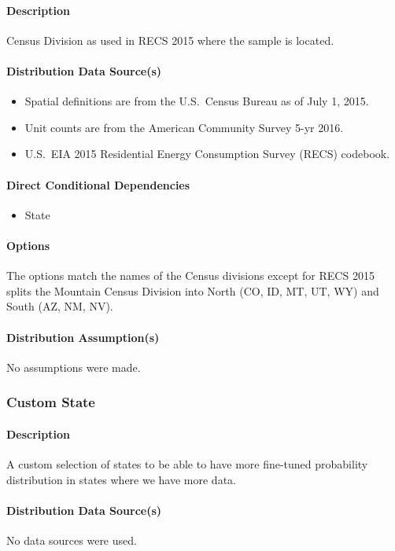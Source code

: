 \paragraph{Description}
Census Division as used in RECS 2015 where the sample is located.

\paragraph{Distribution Data Source(s)}
\begin{itemize}
    \item Spatial definitions are from the U.S.~Census Bureau as of July 1, 2015.
    \item Unit counts are from the American Community Survey 5-yr 2016.
    \item U.S.~EIA 2015 Residential Energy Consumption Survey (RECS) codebook.
\end{itemize}

\paragraph{Direct Conditional Dependencies}
\begin{itemize}
    \item State
\end{itemize}

\paragraph{Options}
The options match the names of the Census divisions except for RECS 2015 splits the Mountain Census Division into North (CO, ID, MT, UT, WY) and South (AZ, NM, NV).

\paragraph{Distribution Assumption(s)}
No assumptions were made.

\subsubsection{Custom State}
\paragraph{Description}
A custom selection of states to be able to have more fine-tuned probability distribution in states where we have more data.

\paragraph{Distribution Data Source(s)}
No data sources were used.

